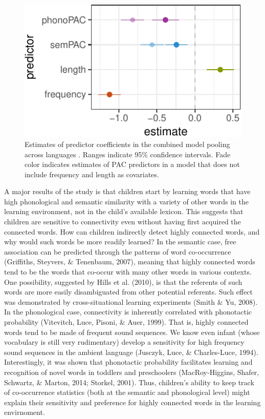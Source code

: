\documentclass[10pt, letterpaper]{article}
\newenvironment{CodeChunk}{}{}
\begin{document}
\begin{CodeChunk}
\begin{figure}[H]

{\centering \includegraphics{figs/regressions_all_img-1} 

}

\caption{\label{fig:regressions_all_img}Estimates of predictor coefficients in the combined model pooling across languages . Ranges indicate 95\% confidence intervals. Fade color indicates estimates of PAC predictors in a model that does not include frequency and length as covariates.}\label{fig:regressions_all_img}
\end{figure}
\end{CodeChunk}

A major results of the study is that children start by learning words
that have high phonological and semantic similarity with a variety of
other words in the learning environment, not in the child's available
lexicon. This suggests that children are sensitive to connectivity even
without having first acquired the connected words. How can children
indirectly detect highly connected words, and why would such words be
more readily learned? In the semantic case, free association can be
predicted through the patterns of word co-occurrence (Griffiths,
Steyvers, \& Tenenbaum, 2007), meaning that highly connected words tend
to be the words that co-occur with many other words in various contexts.
One possibility, suggested by Hills et al. (2010), is that the referents
of such words are more easily disambiguated from other potential
referents. Such effect was demonstrated by cross-situational learning
experiments (Smith \& Yu, 2008). In the phonological case, connectivity
is inherently correlated with phonotactic probability (Vitevitch, Luce,
Pisoni, \& Auer, 1999). That is, highly connected words tend to be made
of frequent sound sequences. We know even infant (whose vocabulary is
still very rudimentary) develop a sensitivity for high frequency sound
sequences in the ambient language (Jusczyk, Luce, \& Charles-Luce,
1994). Interestingly, it was shown that phonotactic probability
facilitates learning and recognition of novel words in toddlers and
preschoolers (MacRoy-Higgins, Shafer, Schwartz, \& Marton, 2014;
Storkel, 2001). Thus, children's ability to keep track of co-occurrence
statistics (both at the semantic and phonological level) might explain
their sensitivity and preference for highly connected words in the
learning envirnoment.
\end{document}
